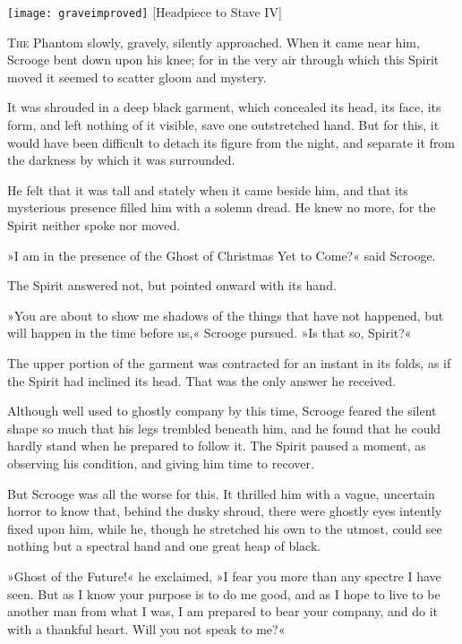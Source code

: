 \begin{minipage}[c]{\textwidth}
\texttt{[image: graveimproved]}
[Headpiece to Stave IV]{}
\end{minipage}
\vfill

\lettrine[lines=4]{T}{he} Phantom slowly, gravely, silently approached. When it came near him, Scrooge bent down upon his knee; for in the very air through which this Spirit moved it seemed to scatter gloom and mystery.

It was shrouded in a deep black garment, which concealed its head, its face, its form, and left nothing of it visible, save one outstretched hand. But for this, it would have been difficult to detach its figure from the night, and separate it from the darkness by which it was surrounded.

He felt that it was tall and stately when it came beside him, and that its mysterious presence filled him with a solemn dread. He knew no more, for the Spirit neither spoke nor moved.

»I am in the presence of the Ghost of Christmas Yet to Come?« said Scrooge.

The Spirit answered not, but pointed onward with its hand.

»You are about to show me shadows of the things that have not happened, but will happen in the time before us,« Scrooge pursued. »Is that so, Spirit?«

The upper portion of the garment was contracted for an instant in its folds, as if the Spirit had inclined its head. That was the only answer he received.

Although well used to ghostly company by this time, Scrooge feared the silent shape so much that his legs trembled beneath him, and he found that he could hardly stand when he prepared to follow it. The Spirit paused a moment, as observing his condition, and giving him time to recover.

But Scrooge was all the worse for this. It thrilled him with a vague, uncertain horror to know that, behind the dusky shroud, there were ghostly eyes intently fixed upon him, while he, though he stretched his own to the utmost, could see nothing but a spectral hand and one great heap of black.

»Ghost of the Future!« he exclaimed, »I fear you more than any spectre I have seen. But as I know your purpose is to do me good, and as I hope to live to be another man from what I was, I am prepared to bear your company, and do it with a thankful heart. Will you not speak to me?«

